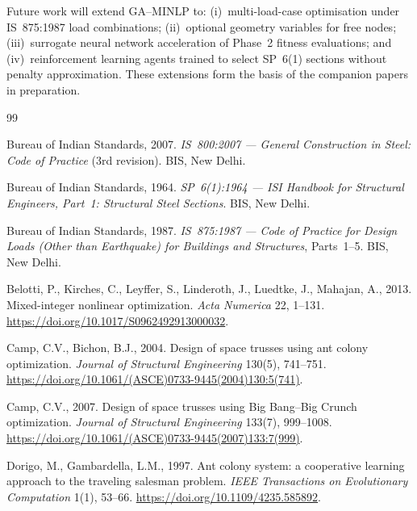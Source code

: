 \documentclass[lineno,pdflatex,sn-mathphys-num]{sn-jnl}
\begin{document}
\noindent
Future work will extend GA--MINLP to: (i)~multi-load-case optimisation
under IS~875:1987 load combinations; (ii)~optional geometry variables for
free nodes; (iii)~surrogate neural network acceleration of Phase~2
fitness evaluations; and (iv)~reinforcement learning agents trained
to select SP~6(1) sections without penalty approximation.
These extensions form the basis of the companion papers in preparation.


\backmatter

\begin{thebibliography}{99}

Bureau of Indian Standards, 2007.
\textit{IS~800:2007 --- General Construction in Steel: Code of Practice}
(3rd revision). BIS, New Delhi.

Bureau of Indian Standards, 1964.
\textit{SP~6(1):1964 --- ISI Handbook for Structural Engineers, Part~1:
Structural Steel Sections}. BIS, New Delhi.

Bureau of Indian Standards, 1987.
\textit{IS~875:1987 --- Code of Practice for Design Loads (Other than
Earthquake) for Buildings and Structures}, Parts~1--5. BIS, New Delhi.

Belotti, P., Kirches, C., Leyffer, S., Linderoth, J., Luedtke, J., Mahajan, A., 2013.
Mixed-integer nonlinear optimization.
\textit{Acta Numerica} 22, 1--131.
\url{https://doi.org/10.1017/S0962492913000032}.

Camp, C.V., Bichon, B.J., 2004.
Design of space trusses using ant colony optimization.
\textit{Journal of Structural Engineering} 130(5), 741--751.
\url{https://doi.org/10.1061/(ASCE)0733-9445(2004)130:5(741)}.

Camp, C.V., 2007.
Design of space trusses using Big Bang--Big Crunch optimization.
\textit{Journal of Structural Engineering} 133(7), 999--1008.
\url{https://doi.org/10.1061/(ASCE)0733-9445(2007)133:7(999)}.

Dorigo, M., Gambardella, L.M., 1997.
Ant colony system: a cooperative learning approach to the traveling salesman problem.
\textit{IEEE Transactions on Evolutionary Computation} 1(1), 53--66.
\url{https://doi.org/10.1109/4235.585892}.


\end{thebibliography}
\end{document}
